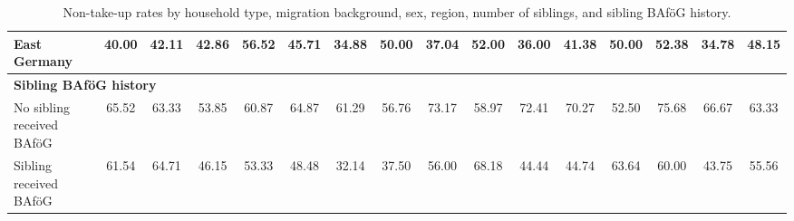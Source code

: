 \begin{landscape}
\begin{table}[H]
\begin{tabular}{lccccccccccccccc}
East Germany & 40.00 & 42.11 & 42.86 & 56.52 & 45.71 & 34.88 & 50.00 & 37.04 & 52.00 & 36.00 & 41.38 & 50.00 & 52.38 & 34.78 & 48.15 \\
\midrule
\multicolumn{16}{l}{\textbf{Sibling BAföG history}} \\
No sibling received BAföG & 65.52 & 63.33 & 53.85 & 60.87 & 64.87 & 61.29 & 56.76 & 73.17 & 58.97 & 72.41 & 70.27 & 52.50 & 75.68 & 66.67 & 63.33 \\
Sibling received BAföG    & 61.54 & 64.71 & 46.15 & 53.33 & 48.48 & 32.14 & 37.50 & 56.00 & 68.18 & 44.44 & 44.74 & 63.64 & 60.00 & 43.75 & 55.56 \\
\bottomrule
\end{tabular}
\caption{Non-take-up rates by household type, migration background, sex, region, number of siblings, and sibling BAföG history.}
\end{table}
\end{landscape}

